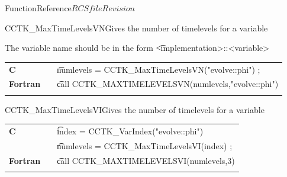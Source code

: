 \begin{cactuspart}{FunctionReference}{$RCSfile$}{$Revision$}
\begin{CCTKFunc}{CCTK\_MaxTimeLevelsVN}{Gives the number of timelevels for a variable}
\label{CCTK-MaxTimeLevelsVN}
\showargs
\begin{params}
\end{params}
\begin{discussion}
The variable name should be in the form {\t <implementation>::<variable>}
\end{discussion}
\begin{examples}
\begin{tabular}{@{}p{3cm}cp{11cm}}
\hfill {\bf C} && {\t numlevels = CCTK\_MaxTimeLevelsVN("evolve::phi") ;}
\\
\hfill {\bf Fortran} && {\t call CCTK\_MAXTIMELEVELSVN(numlevels,"evolve::phi")}\\
\\
\end{tabular}
\end{examples}
\begin{errorcodes}
\end{errorcodes}
\end{CCTKFunc}


\begin{CCTKFunc}{CCTK\_MaxTimeLevelsVI}{Gives the number of timelevels for a variable}
\label{CCTK-MaxTimeLevelsVI}
\showargs
\begin{params}
\end{params}
\begin{discussion}
\end{discussion}
\begin{examples}
\begin{tabular}{@{}p{3cm}cp{11cm}}
\hfill {\bf C} && {\t index = CCTK\_VarIndex("evolve::phi")}\\
               &&{\t numlevels = CCTK\_MaxTimeLevelsVI(index) ;}
\\
\hfill {\bf Fortran} && {\t call CCTK\_MAXTIMELEVELSVI(numlevels,3)}\\
\\
\end{tabular}
\end{examples}
\begin{errorcodes}
\end{errorcodes}
\end{CCTKFunc}



\end{cactuspart}
